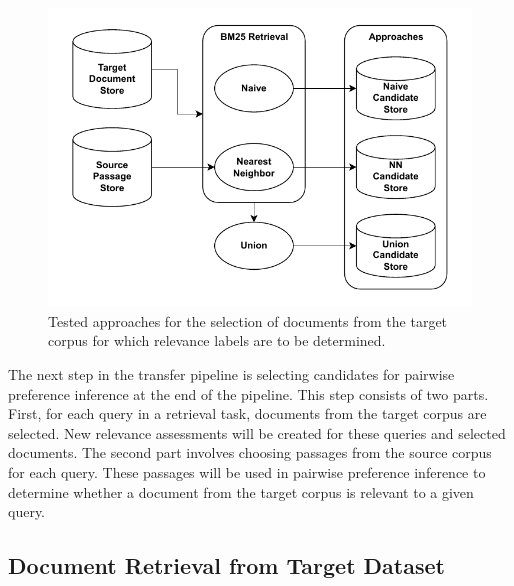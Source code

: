 \begin{figure}[t]
    \centering
    \includegraphics[width=\textwidth]{./graphics/drawio/candidate_selection.pdf}
    \caption{Tested approaches for the selection of documents from the target corpus for which relevance labels are to be determined.}
\end{figure}

The next step in the transfer pipeline is selecting candidates for pairwise preference inference at the end of the pipeline. This step consists of two parts. First, for each query in a retrieval task, documents from the target corpus are selected. New relevance assessments will be created for these queries and selected documents. The second part involves choosing passages from the source corpus for each query. These passages will be used in pairwise preference inference to determine whether a document from the target corpus is relevant to a given query.

\subsection{Document Retrieval from Target Dataset}\label{document-retrieval-from-target-dataset}

